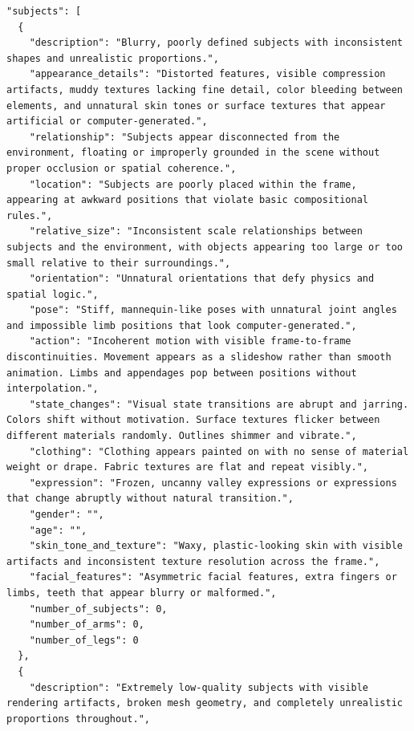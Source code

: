 \documentclass{llmxive}
\begin{document}
\begin{tcolorbox}[
    breakable,
    colback=black!2,
    colframe=nvidiagreen!75!white,
    boxrule=0.4pt,
    arc=1pt,
    left=4pt,
    right=4pt,
    top=4pt,
    bottom=4pt,
    title=Cosmos 3 Base Generator Negative Prompt,
]
\begin{Verbatim}[breaklines=true,breakanywhere=true,fontsize=\scriptsize]
"subjects": [
  {
    "description": "Blurry, poorly defined subjects with inconsistent shapes and unrealistic proportions.",
    "appearance_details": "Distorted features, visible compression artifacts, muddy textures lacking fine detail, color bleeding between elements, and unnatural skin tones or surface textures that appear artificial or computer-generated.",
    "relationship": "Subjects appear disconnected from the environment, floating or improperly grounded in the scene without proper occlusion or spatial coherence.",
    "location": "Subjects are poorly placed within the frame, appearing at awkward positions that violate basic compositional rules.",
    "relative_size": "Inconsistent scale relationships between subjects and the environment, with objects appearing too large or too small relative to their surroundings.",
    "orientation": "Unnatural orientations that defy physics and spatial logic.",
    "pose": "Stiff, mannequin-like poses with unnatural joint angles and impossible limb positions that look computer-generated.",
    "action": "Incoherent motion with visible frame-to-frame discontinuities. Movement appears as a slideshow rather than smooth animation. Limbs and appendages pop between positions without interpolation.",
    "state_changes": "Visual state transitions are abrupt and jarring. Colors shift without motivation. Surface textures flicker between different materials randomly. Outlines shimmer and vibrate.",
    "clothing": "Clothing appears painted on with no sense of material weight or drape. Fabric textures are flat and repeat visibly.",
    "expression": "Frozen, uncanny valley expressions or expressions that change abruptly without natural transition.",
    "gender": "",
    "age": "",
    "skin_tone_and_texture": "Waxy, plastic-looking skin with visible artifacts and inconsistent texture resolution across the frame.",
    "facial_features": "Asymmetric facial features, extra fingers or limbs, teeth that appear blurry or malformed.",
    "number_of_subjects": 0,
    "number_of_arms": 0,
    "number_of_legs": 0
  },
  {
    "description": "Extremely low-quality subjects with visible rendering artifacts, broken mesh geometry, and completely unrealistic proportions throughout.",

\end{Verbatim}
\end{tcolorbox}
\end{document}
